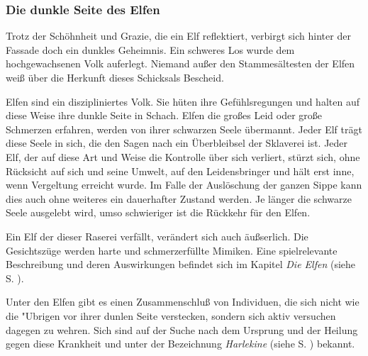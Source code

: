 \subsubsection{Die dunkle Seite des Elfen}
\par Trotz der Schöhnheit und Grazie, die ein Elf reflektiert,
verbirgt sich hinter der Fassade doch ein dunkles Geheimnis. Ein
schweres Los wurde dem hochgewachsenen Volk auferlegt. Niemand außer
den Stammesältesten der Elfen weiß über die Herkunft dieses
Schicksals Bescheid.
\par Elfen sind ein diszipliniertes Volk. Sie hüten ihre
Gefühlsregungen und halten auf diese Weise ihre dunkle Seite in
Schach. Elfen die großes Leid oder große Schmerzen erfahren, werden
von ihrer schwarzen Seele übermannt. Jeder
Elf trägt diese Seele in sich, die den Sagen nach ein Überbleibsel
der Sklaverei ist. Jeder Elf, der auf diese Art und Weise die
Kontrolle über sich verliert, stürzt sich, ohne Rücksicht auf
sich und seine Umwelt, auf den Leidensbringer und hält erst inne,
wenn Vergeltung erreicht wurde. Im Falle der Auslöschung der ganzen
Sippe kann dies auch ohne weiteres ein dauerhafter Zustand werden.
Je länger die schwarze Seele ausgelebt wird, umso schwieriger ist
die Rückkehr für den Elfen.
\par Ein Elf der dieser Raserei verfällt, verändert sich auch
äußserlich. Die Gesichtszüge werden harte und schmerzerfüllte
Mimiken. Eine spielrelevante Beschreibung und deren Auswirkungen
befindet sich im Kapitel \textit{Die Elfen} (siehe S.
\pageref{dieelfen}).
\par Unter den Elfen gibt es einen Zusammenschluß von Individuen,
die sich nicht wie die "Ubrigen vor ihrer dunlen Seite verstecken,
sondern sich aktiv versuchen dagegen zu wehren. Sich sind auf der
Suche nach dem Ursprung und der Heilung gegen diese Krankheit und
unter der Bezeichnung \textit{Harlekine} (siehe
S. \pageref{harlekine}) bekannt.
